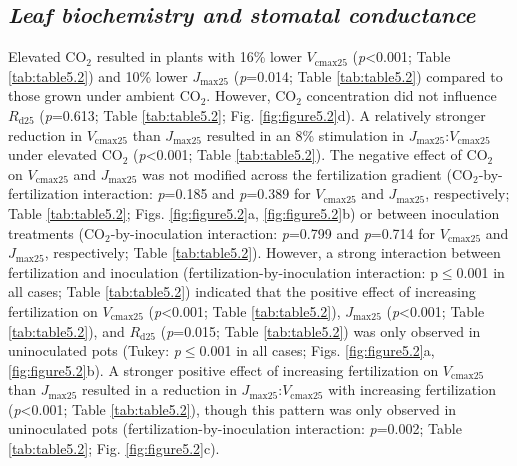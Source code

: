 \subsection{\textit{Leaf biochemistry and stomatal conductance}}
\noindent Elevated CO$_2$ resulted in plants with 16\% lower $V_\mathrm{cmax25}$ (\textit{p}<0.001; Table \ref{tab:table5.2}) and 10\% lower $J_\mathrm{max25}$ (\textit{p}=0.014; Table \ref{tab:table5.2}) compared to those grown under ambient CO$_2$. However, CO$_2$ concentration did not influence $R_\mathrm{d25}$ (\textit{p}=0.613; Table \ref{tab:table5.2}; Fig. \ref{fig:figure5.2}d). A relatively stronger reduction in $V_\mathrm{cmax25}$ than $J_\mathrm{max25}$ resulted in an 8\% stimulation in $J_\mathrm{max25}$:$V_\mathrm{cmax25}$ under elevated CO$_2$ (\textit{p}<0.001; Table \ref{tab:table5.2}). The negative effect of CO$_2$ on $V_\mathrm{cmax25}$ and $J_\mathrm{max25}$ was not modified across the fertilization gradient (CO$_2$-by-fertilization interaction: \textit{p}=0.185 and \textit{p}=0.389 for $V_\mathrm{cmax25}$ and $J_\mathrm{max25}$, respectively; Table \ref{tab:table5.2}; Figs. \ref{fig:figure5.2}a, \ref{fig:figure5.2}b) or between inoculation treatments (CO$_2$-by-inoculation interaction: \textit{p}=0.799 and \textit{p}=0.714 for $V_\mathrm{cmax25}$ and $J_\mathrm{max25}$, respectively; Table \ref{tab:table5.2}). However, a strong interaction between fertilization and inoculation (fertilization-by-inoculation interaction: p$\le$0.001 in all cases; Table \ref{tab:table5.2}) indicated that the  positive effect of increasing fertilization on $V_\mathrm{cmax25}$ (\textit{p}<0.001; Table \ref{tab:table5.2}), $J_\mathrm{max25}$ (\textit{p}<0.001; Table \ref{tab:table5.2}), and $R_\mathrm{d25}$ (\textit{p}=0.015; Table \ref{tab:table5.2}) was only observed in uninoculated pots (Tukey: \textit{p}$\le$0.001 in all cases; Figs. \ref{fig:figure5.2}a, \ref{fig:figure5.2}b). A stronger positive effect of increasing fertilization on $V_\mathrm{cmax25}$ than $J_\mathrm{max25}$ resulted in a reduction in $J_\mathrm{max25}$:$V_\mathrm{cmax25}$ with increasing fertilization (\textit{p}<0.001; Table \ref{tab:table5.2}), though this pattern was only observed in uninoculated pots (fertilization-by-inoculation interaction: \textit{p}=0.002; Table \ref{tab:table5.2}; Fig. \ref{fig:figure5.2}c).


